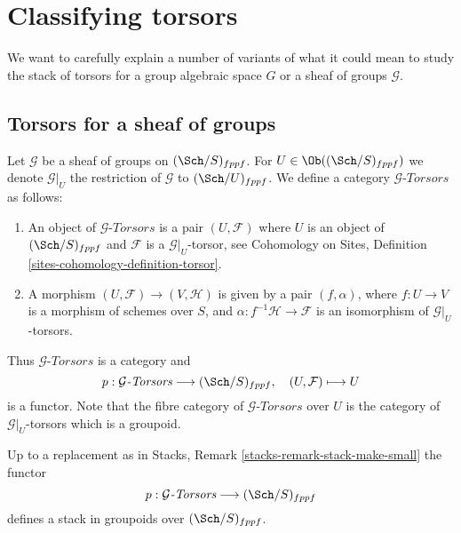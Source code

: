 \section{Classifying torsors}
\label{section-torsors}

\noindent
We want to carefully explain a number of variants of what it could
mean to study the stack of torsors for a group algebraic space $G$
or a sheaf of groups $\mathcal{G}$.



\subsection{Torsors for a sheaf of groups}
\label{subsection-torsors-sheaf}

\noindent
Let $\mathcal{G}$ be a sheaf of groups on $(\Sch/S)_{fppf}$.
For $U \in \Ob((\Sch/S)_{fppf})$ we denote
$\mathcal{G}|_U$ the restriction of $\mathcal{G}$ to $(\Sch/U)_{fppf}$.
We define a category $\mathcal{G}\textit{-Torsors}$ as follows:
\begin{enumerate}
\item An object of $\mathcal{G}\textit{-Torsors}$ is a pair
$(U, \mathcal{F})$ where $U$ is an object of $(\Sch/S)_{fppf}$
and $\mathcal{F}$ is a $\mathcal{G}|_U$-torsor, see
Cohomology on Sites, Definition \ref{sites-cohomology-definition-torsor}.
\item A morphism $(U, \mathcal{F}) \to (V, \mathcal{H})$ is given
by a pair $(f, \alpha)$, where $f : U \to V$ is a morphism of schemes
over $S$, and $\alpha : f^{-1}\mathcal{H} \to \mathcal{F}$ is an
isomorphism of $\mathcal{G}|_U$-torsors.
\end{enumerate}
Thus $\mathcal{G}\textit{-Torsors}$ is a category and
$$
p : \mathcal{G}\textit{-Torsors} \longrightarrow (\Sch/S)_{fppf},
\quad
(U, \mathcal{F}) \longmapsto U
$$
is a functor. Note that the fibre category of $\mathcal{G}\textit{-Torsors}$
over $U$ is the category of $\mathcal{G}|_U$-torsors which is a groupoid.

\begin{lemma}
\label{lemma-torsors-sheaf-stack-in-groupoids}
Up to a replacement as in
Stacks, Remark \ref{stacks-remark-stack-make-small}
the functor
$$
p : \mathcal{G}\textit{-Torsors} \longrightarrow (\Sch/S)_{fppf}
$$
defines a stack in groupoids over $(\Sch/S)_{fppf}$.
\end{lemma}

